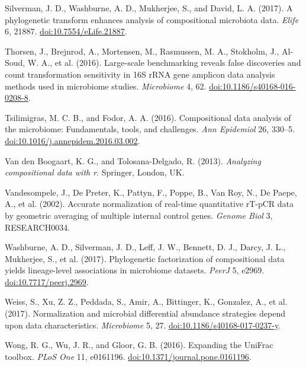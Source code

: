\documentclass[twocolumn]{article}
\begin{document}
Silverman, J. D., Washburne, A. D., Mukherjee, S., and David, L. A.
(2017). A phylogenetic transform enhances analysis of compositional
microbiota data. \emph{Elife} 6, 21887.
\href{http://doi.org/10.7554/eLife.21887}{doi:10.7554/eLife.21887}.

Thorsen, J., Brejnrod, A., Mortensen, M., Rasmussen, M. A., Stokholm,
J., Al-Soud, W. A., et al. (2016). Large-scale benchmarking reveals
false discoveries and count transformation sensitivity in 16S rRNA gene
amplicon data analysis methods used in microbiome studies.
\emph{Microbiome} 4, 62.
\href{http://doi.org/10.1186/s40168-016-0208-8}{doi:10.1186/s40168-016-0208-8}.

Tsilimigras, M. C. B., and Fodor, A. A. (2016). Compositional data
analysis of the microbiome: Fundamentals, tools, and challenges.
\emph{Ann Epidemiol} 26, 330--5.
\href{http://doi.org/10.1016/j.annepidem.2016.03.002}{doi:10.1016/j.annepidem.2016.03.002}.

Van den Boogaart, K. G., and Tolosana-Delgado, R. (2013).
\emph{Analyzing compositional data with r}. Springer, London, UK.

Vandesompele, J., De Preter, K., Pattyn, F., Poppe, B., Van Roy, N., De
Paepe, A., et al. (2002). Accurate normalization of real-time
quantitative rT-pCR data by geometric averaging of multiple internal
control genes. \emph{Genome Biol} 3, RESEARCH0034.

Washburne, A. D., Silverman, J. D., Leff, J. W., Bennett, D. J., Darcy,
J. L., Mukherjee, S., et al. (2017). Phylogenetic factorization of
compositional data yields lineage-level associations in microbiome
datasets. \emph{PeerJ} 5, e2969.
\href{http://doi.org/10.7717/peerj.2969}{doi:10.7717/peerj.2969}.

Weiss, S., Xu, Z. Z., Peddada, S., Amir, A., Bittinger, K., Gonzalez,
A., et al. (2017). Normalization and microbial differential abundance
strategies depend upon data characteristics. \emph{Microbiome} 5, 27.
\href{http://doi.org/10.1186/s40168-017-0237-y}{doi:10.1186/s40168-017-0237-y}.

Wong, R. G., Wu, J. R., and Gloor, G. B. (2016). Expanding the UniFrac
toolbox. \emph{PLoS One} 11, e0161196.
\href{http://doi.org/10.1371/journal.pone.0161196}{doi:10.1371/journal.pone.0161196}.
\end{document}
